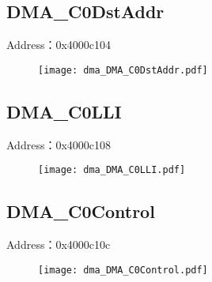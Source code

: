 \subsection{DMA\_C0DstAddr}
\label{dma-DMA-C0DstAddr}
Address：0x4000c104
 \begin{figure}[H]
\texttt{[image: dma\_DMA\_C0DstAddr.pdf]}
\end{figure}

\subsection{DMA\_C0LLI}
\label{dma-DMA-C0LLI}
Address：0x4000c108
 \begin{figure}[H]
\texttt{[image: dma\_DMA\_C0LLI.pdf]}
\end{figure}

\subsection{DMA\_C0Control}
\label{dma-DMA-C0Control}
Address：0x4000c10c
 \begin{figure}[H]
\texttt{[image: dma\_DMA\_C0Control.pdf]}
\end{figure}

